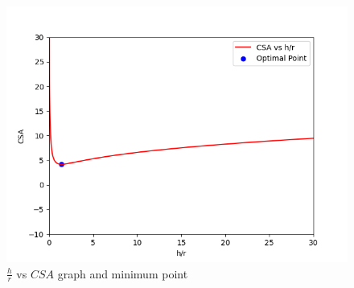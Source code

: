 \documentclass[article]{IEEEtran}
\numberwithin{figure}{enumi}
\begin{document}
\begin{figure}[h!]
   \centering
   \includegraphics[width=\columnwidth]{figures/fig.png}
   \caption{$\frac{h}{r}$ vs $CSA$ graph and minimum point}
   \label{stemplot}
\end{figure}
\end{document}
